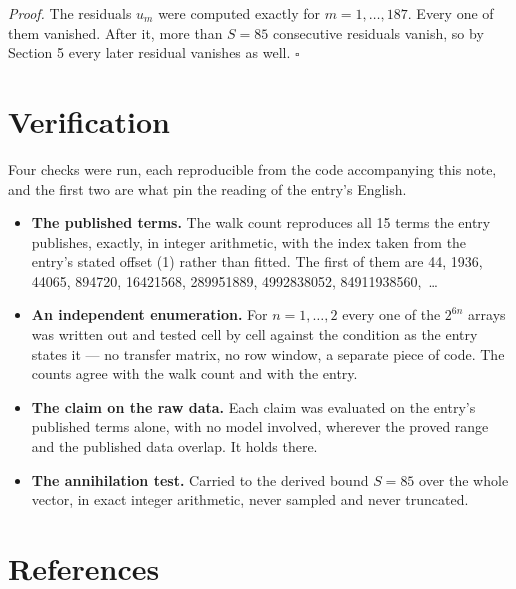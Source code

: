 \documentclass[11pt]{article}
\theoremstyle{definition}
\begin{document}
{\itshape Proof.} The residuals $u_m$ were computed exactly for $m = 1,\dots,187$. Every one of them vanished. After it, more than $S = 85$ consecutive residuals vanish, so by Section 5 every later residual vanishes as well. $\square$

\section{Verification}

Four checks were run, each reproducible from the code accompanying this note, and the first two are what pin the reading of the entry's English.

\begin{itemize}

\item {\bfseries The published terms.} The walk count reproduces all 15 terms the entry publishes, exactly, in integer arithmetic, with the index taken from the entry's stated offset (1) rather than fitted. The first of them are 44, 1936, 44065, 894720, 16421568, 289951889, 4992838052, 84911938560,~\dots

\item {\bfseries An independent enumeration.} For $n = 1,\dots,2$ every one of the $2^{6n}$ arrays was written out and tested cell by cell against the condition as the entry states it --- no transfer matrix, no row window, a separate piece of code. The counts agree with the walk count and with the entry.

\item {\bfseries The claim on the raw data.} Each claim was evaluated on the entry's published terms alone, with no model involved, wherever the proved range and the published data overlap. It holds there.

\item {\bfseries The annihilation test.} Carried to the derived bound $S = 85$ over the whole vector, in exact integer arithmetic, never sampled and never truncated.

\end{itemize}

\section{References}
\end{document}
